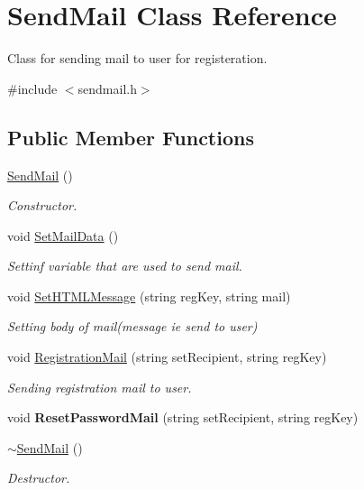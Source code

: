 \hypertarget{classSendMail}{\section{Send\-Mail Class Reference}
\label{classSendMail}
}


Class for sending mail to user for registeration.  




{\ttfamily \#include $<$sendmail.\-h$>$}

\subsection*{Public Member Functions}
\begin{DoxyCompactItemize}
\item 
\hyperlink{classSendMail_ae0d11ddeda1ae7ae1cc3b8f11678ed92}{Send\-Mail} ()
\begin{DoxyCompactList}\small\item\em Constructor. \end{DoxyCompactList}\item 
void \hyperlink{classSendMail_a25ba5afabc97cf3dab525f2eb1e67e0e}{Set\-Mail\-Data} ()
\begin{DoxyCompactList}\small\item\em Settinf variable that are used to send mail. \end{DoxyCompactList}\item 
void \hyperlink{classSendMail_a89c5a5bace5c21014b8184db5707b986}{Set\-H\-T\-M\-L\-Message} (string reg\-Key, string mail)
\begin{DoxyCompactList}\small\item\em Setting body of mail(message ie send to user) \end{DoxyCompactList}\item 
void \hyperlink{classSendMail_a4c9983852dbcd1eb07170582761ed559}{Registration\-Mail} (string set\-Recipient, string reg\-Key)
\begin{DoxyCompactList}\small\item\em Sending registration mail to user. \end{DoxyCompactList}\item 
\hypertarget{classSendMail_a56180b5a27efd4d43514f91008b280ef}{void {\bfseries Reset\-Password\-Mail} (string set\-Recipient, string reg\-Key)}\label{classSendMail_a56180b5a27efd4d43514f91008b280ef}

\item 
\hyperlink{classSendMail_acc86b2a9995472436dbd77b3c6bb91f3}{$\sim$\-Send\-Mail} ()
\begin{DoxyCompactList}\small\item\em Destructor. \end{DoxyCompactList}\end{DoxyCompactItemize}
